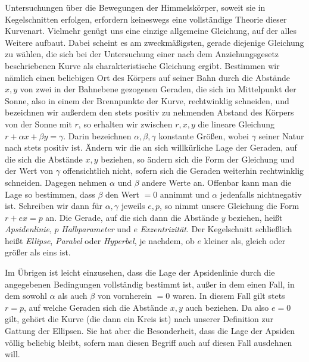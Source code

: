 Untersuchungen über die Bewegungen der Himmelskörper, soweit sie in Kegelschnitten erfolgen, erfordern keineswegs eine vollständige Theorie dieser Kurvenart. Vielmehr genügt uns eine einzige allgemeine Gleichung, auf der alles Weitere aufbaut. Dabei scheint es am zweckmäßigsten, gerade diejenige Gleichung zu wählen, die sich bei der Untersuchung einer nach dem Anziehungsgesetz beschriebenen Kurve als charakteristische Gleichung ergibt. Bestimmen wir nämlich einen beliebigen Ort des Körpers auf seiner Bahn durch die Abstände $x, y$ von zwei in der Bahnebene gezogenen Geraden, die sich im Mittelpunkt der Sonne, also in einem der Brennpunkte der Kurve, rechtwinklig schneiden, und bezeichnen wir außerdem den stets positiv zu nehmenden Abstand des Körpers von der Sonne mit $r$, so erhalten wir zwischen $r, x, y$ die lineare Gleichung $r+\alpha x+\beta y=\gamma$. Darin bezeichnen $\alpha, \beta, \gamma$ konstante Größen, wobei $\gamma$ seiner Natur nach stets positiv ist. Ändern wir die an sich willkürliche Lage der Geraden, auf die sich die Abstände $x, y$ beziehen, so ändern sich die Form der Gleichung und der Wert von $\gamma$ offensichtlich nicht, sofern sich die Geraden weiterhin rechtwinklig schneiden. Dagegen nehmen $\alpha$ und $\beta$ andere Werte an. Offenbar kann man die Lage so bestimmen, dass $\beta$ den Wert $=0$ annimmt und $\alpha$ jedenfalls nichtnegativ ist. Schreiben wir dann für $\alpha, \gamma$ jeweils $e, p$, so nimmt unsere Gleichung die Form $r+ex=p$ an. Die Gerade, auf die sich dann die Abstände $y$ beziehen, heißt \emph{Apsidenlinie}, $p$ \emph{Halbparameter} und $e$ \emph{Exzentrizität}. Der Kegelschnitt schließlich heißt \emph{Ellipse}, \emph{Parabel} oder \emph{Hyperbel}, je nachdem, ob $e$ kleiner als, gleich oder größer als eins ist.

Im Übrigen ist leicht einzusehen, dass die Lage der Apsidenlinie durch die angegebenen Bedingungen vollständig bestimmt ist, außer in dem einen Fall, in dem sowohl $\alpha$ als auch $\beta$ von vornherein $=0$ waren. In diesem Fall gilt stets $r=p$, auf welche Geraden sich die Abstände $x, y$ auch beziehen. Da also $e=0$ gilt, gehört die Kurve (die dann ein Kreis ist) nach unserer Definition zur Gattung der Ellipsen. Sie hat aber die Besonderheit, dass die Lage der Apsiden völlig beliebig bleibt, sofern man diesen Begriff auch auf diesen Fall ausdehnen will.
